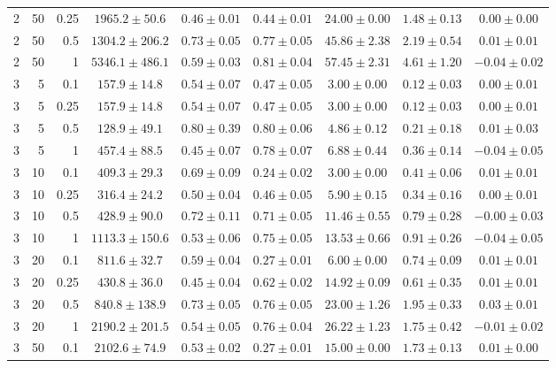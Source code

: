 \begin{table}[htbp]
\begin{tabular}{@{}rrrcccccc@{}}
2 & 50 & 0.25 & $1965.2 \pm 50.6$ & $0.46 \pm 0.01$ & $0.44 \pm 0.01$ & $24.00 \pm 0.00$ & $1.48 \pm 0.13$ & $0.00 \pm 0.00$ \\
2 & 50 & 0.5 & $1304.2 \pm 206.2$ & $0.73 \pm 0.05$ & $0.77 \pm 0.05$ & $45.86 \pm 2.38$ & $2.19 \pm 0.54$ & $0.01 \pm 0.01$ \\
2 & 50 & 1 & $5346.1 \pm 486.1$ & $0.59 \pm 0.03$ & $0.81 \pm 0.04$ & $57.45 \pm 2.31$ & $4.61 \pm 1.20$ & $-0.04 \pm 0.02$ \\
\midrule
3 & 5 & 0.1 & $157.9 \pm 14.8$ & $0.54 \pm 0.07$ & $0.47 \pm 0.05$ & $3.00 \pm 0.00$ & $0.12 \pm 0.03$ & $0.00 \pm 0.01$ \\
3 & 5 & 0.25 & $157.9 \pm 14.8$ & $0.54 \pm 0.07$ & $0.47 \pm 0.05$ & $3.00 \pm 0.00$ & $0.12 \pm 0.03$ & $0.00 \pm 0.01$ \\
3 & 5 & 0.5 & $128.9 \pm 49.1$ & $0.80 \pm 0.39$ & $0.80 \pm 0.06$ & $4.86 \pm 0.12$ & $0.21 \pm 0.18$ & $0.01 \pm 0.03$ \\
3 & 5 & 1 & $457.4 \pm 88.5$ & $0.45 \pm 0.07$ & $0.78 \pm 0.07$ & $6.88 \pm 0.44$ & $0.36 \pm 0.14$ & $-0.04 \pm 0.05$ \\
3 & 10 & 0.1 & $409.3 \pm 29.3$ & $0.69 \pm 0.09$ & $0.24 \pm 0.02$ & $3.00 \pm 0.00$ & $0.41 \pm 0.06$ & $0.01 \pm 0.01$ \\
3 & 10 & 0.25 & $316.4 \pm 24.2$ & $0.50 \pm 0.04$ & $0.46 \pm 0.05$ & $5.90 \pm 0.15$ & $0.34 \pm 0.16$ & $0.00 \pm 0.01$ \\
3 & 10 & 0.5 & $428.9 \pm 90.0$ & $0.72 \pm 0.11$ & $0.71 \pm 0.05$ & $11.46 \pm 0.55$ & $0.79 \pm 0.28$ & $-0.00 \pm 0.03$ \\
3 & 10 & 1 & $1113.3 \pm 150.6$ & $0.53 \pm 0.06$ & $0.75 \pm 0.05$ & $13.53 \pm 0.66$ & $0.91 \pm 0.26$ & $-0.04 \pm 0.05$ \\
3 & 20 & 0.1 & $811.6 \pm 32.7$ & $0.59 \pm 0.04$ & $0.27 \pm 0.01$ & $6.00 \pm 0.00$ & $0.74 \pm 0.09$ & $0.01 \pm 0.01$ \\
3 & 20 & 0.25 & $430.8 \pm 36.0$ & $0.45 \pm 0.04$ & $0.62 \pm 0.02$ & $14.92 \pm 0.09$ & $0.61 \pm 0.35$ & $0.01 \pm 0.01$ \\
3 & 20 & 0.5 & $840.8 \pm 138.9$ & $0.73 \pm 0.05$ & $0.76 \pm 0.05$ & $23.00 \pm 1.26$ & $1.95 \pm 0.33$ & $0.03 \pm 0.01$ \\
3 & 20 & 1 & $2190.2 \pm 201.5$ & $0.54 \pm 0.05$ & $0.76 \pm 0.04$ & $26.22 \pm 1.23$ & $1.75 \pm 0.42$ & $-0.01 \pm 0.02$ \\
3 & 50 & 0.1 & $2102.6 \pm 74.9$ & $0.53 \pm 0.02$ & $0.27 \pm 0.01$ & $15.00 \pm 0.00$ & $1.73 \pm 0.13$ & $0.01 \pm 0.00$ \\

\end{tabular}
\end{table}

